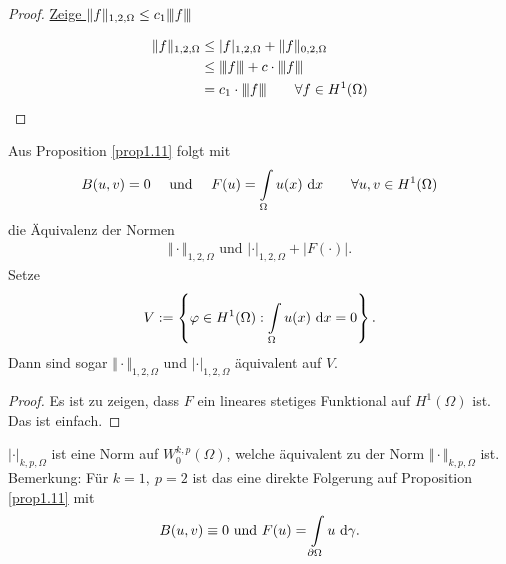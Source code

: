 \begin{proof}
	\underline{Zeige $\|f\|_{1,2,\Omega}\leq c_1 {\left\vert\kern-0.25ex\left\vert\kern-0.25ex\left\vert f \right\vert\kern-0.25ex\right\vert\kern-0.25ex\right\vert}$}

	\begin{align*}
		\Vert f\Vert_{1,2,\Omega}
		&\leq
		|f|_{1,2,\Omega}+\Vert f\Vert_{0,2,\Omega}\\
		&\leq
		{\left\vert\kern-0.25ex\left\vert\kern-0.25ex\left\vert f \right\vert\kern-0.25ex\right\vert\kern-0.25ex\right\vert}+c\cdot{\left\vert\kern-0.25ex\left\vert\kern-0.25ex\left\vert f \right\vert\kern-0.25ex\right\vert\kern-0.25ex\right\vert}\\
		&=c_1\cdot{\left\vert\kern-0.25ex\left\vert\kern-0.25ex\left\vert f \right\vert\kern-0.25ex\right\vert\kern-0.25ex\right\vert}\qquad\forall f\in H^1(\Omega)
	\end{align*}
\end{proof}

\begin{korollar}\label{korollarPoincareUngleichung}\enter %
	Aus Proposition \ref{prop1.11} folgt mit
	\begin{align*}
		B(u,v)=0\quad\text{ und }\quad F(u)=\int\limits_\Omega u(x)\text{ d} x
		\qquad\forall u,v\in H^1(\Omega)
	\end{align*}
	die Äquivalenz der Normen
	\begin{align*}
		\Vert\cdot\Vert_{1,2,\Omega}\text{ und } |\cdot|_{1,2,\Omega}+|F(\cdot)|.
	\end{align*}
	Setze
	\begin{align*}
		V:=\left\lbrace\varphi\in H^1(\Omega):\int\limits_\Omega u(x)\text{ d} x=0\right\rbrace.
	\end{align*}
	Dann sind sogar $\Vert\cdot\Vert_{1,2,\Omega}$ und $|\cdot|_{1,2,\Omega}$ äquivalent auf $V$.
\end{korollar}

\begin{proof}
	Es ist zu zeigen, dass $F$ ein lineares stetiges Funktional auf $H^1(\Omega)$  ist. Das ist einfach.
\end{proof}

\begin{proposition}\label{prop1.13FriedrichsUngleichung}\enter
	$|\cdot|_{k,p,\Omega}$ ist eine Norm auf $W_0^{k,p}(\Omega)$, welche äquivalent zu der Norm $\Vert\cdot\Vert_{k,p,\Omega}$ ist.\nl
	Bemerkung: Für $k=1,~p=2$ ist das eine direkte Folgerung auf Proposition \ref{prop1.11} mit
	\begin{align*}
		B(u,v)\equiv0\text{ und } F(u)=\int\limits_{\partial\Omega} u\text{ d} \gamma.
	\end{align*}
\end{proposition}

